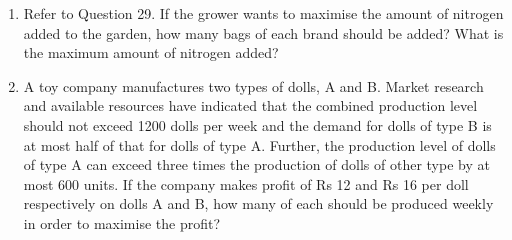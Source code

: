 \begin{enumerate}[label=\arabic*.,ref=\thesubsection.\theenumi]
\begin{tabular}{|c|c|c|}
\end{tabular}

\item Refer to Question 29. If the grower wants to maximise the amount of nitrogen
added to the garden, how many bags of each brand should be added? What is
the maximum amount of nitrogen added?\\
\item A toy company manufactures two types of dolls, A and B. Market research and
available resources have indicated that the combined production level should not
exceed 1200 dolls per week and the demand for dolls of type B is at most half of that
for dolls of type A. Further, the production level of dolls of type A can exceed three
times the production of dolls of other type by at most 600 units. If the company
makes profit of Rs 12 and Rs 16 per doll respectively on dolls A and B, how many of
each should be produced weekly in order to maximise the profit?





\end{enumerate}
%
